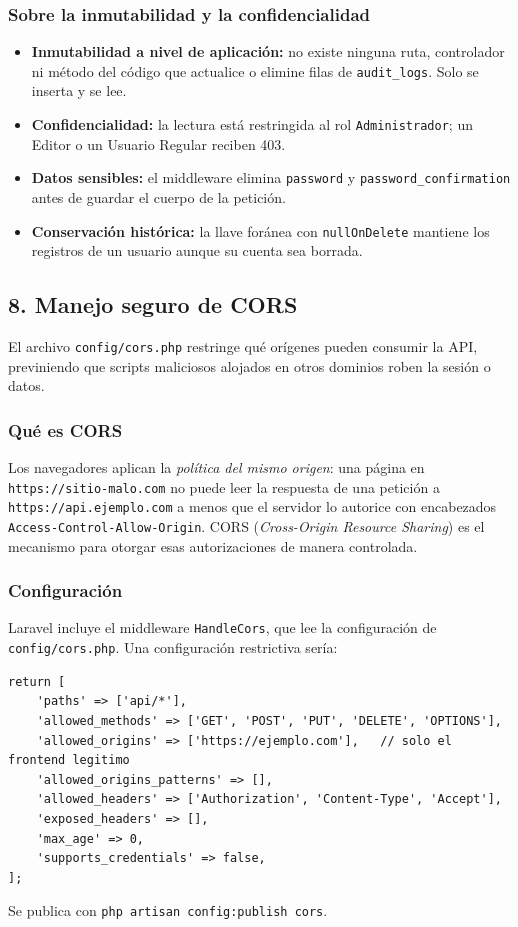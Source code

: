 \subsubsection{Sobre la inmutabilidad y la confidencialidad}
\begin{itemize}
    \item \textbf{Inmutabilidad a nivel de aplicación:} no existe ninguna ruta, controlador ni método del código que actualice o elimine filas de \texttt{audit\_logs}. Solo se inserta y se lee.
    \item \textbf{Confidencialidad:} la lectura está restringida al rol \texttt{Administrador}; un Editor o un Usuario Regular reciben 403.
    \item \textbf{Datos sensibles:} el middleware elimina \texttt{password} y \texttt{password\_confirmation} antes de guardar el cuerpo de la petición.
    \item \textbf{Conservación histórica:} la llave foránea con \texttt{nullOnDelete} mantiene los registros de un usuario aunque su cuenta sea borrada.
\end{itemize}

\subsection{8. Manejo seguro de CORS}
El archivo \texttt{config/cors.php} restringe qué orígenes pueden consumir la API, previniendo que scripts maliciosos alojados en otros dominios roben la sesión o datos.

\subsubsection{Qué es CORS}
Los navegadores aplican la \emph{política del mismo origen}: una página en \texttt{https://sitio-malo.com} no puede leer la respuesta de una petición a \texttt{https://api.ejemplo.com} a menos que el servidor lo autorice con encabezados \texttt{Access-Control-Allow-Origin}. CORS (\emph{Cross-Origin Resource Sharing}) es el mecanismo para otorgar esas autorizaciones de manera controlada.

\subsubsection{Configuración}
Laravel incluye el middleware \texttt{HandleCors}, que lee la configuración de \texttt{config/cors.php}. Una configuración restrictiva sería:
\begin{lstlisting}[caption={config/cors.php (configuración restrictiva recomendada)}]
return [
    'paths' => ['api/*'],
    'allowed_methods' => ['GET', 'POST', 'PUT', 'DELETE', 'OPTIONS'],
    'allowed_origins' => ['https://ejemplo.com'],   // solo el frontend legitimo
    'allowed_origins_patterns' => [],
    'allowed_headers' => ['Authorization', 'Content-Type', 'Accept'],
    'exposed_headers' => [],
    'max_age' => 0,
    'supports_credentials' => false,
];
\end{lstlisting}
Se publica con \texttt{php artisan config:publish cors}.

